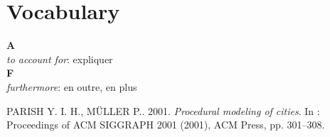 \documentclass[11pt]{article}
\begin{document}
\section{Vocabulary}

\noindent \textbf{A}\\
\textit{to account for}: expliquer \\
\textbf{F}\\
\textit{furthermore}: en outre, en plus \\

\begin{thebibliography}{2} 

\label{Parish and Muller (2001)}
PARISH Y. I. H., MÜLLER P.. 2001.
\textit{Procedural modeling of cities}.
In : Proceedings of ACM SIGGRAPH 2001 (2001), ACM Press, pp. 301–308.

\end{thebibliography}
\end{document}
